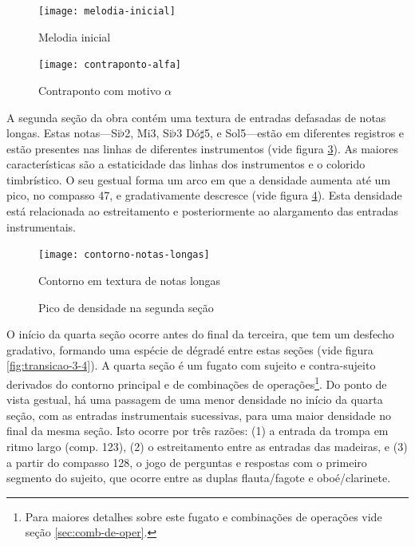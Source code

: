 \begin{figure}
  \centering
  \texttt{[image: melodia-inicial]}
  \caption{Melodia inicial}
  \label{fig:melodia-inicial}
\end{figure}

\begin{figure}
  \centering
  \texttt{[image: contraponto-alfa]}
  \caption{Contraponto com motivo $\alpha$}
  \label{fig:contraponto-alfa}
\end{figure}

A segunda seção da obra contém uma textura de entradas defasadas de
notas longas. Estas notas---Si$\flat$2, Mi3, Si$\flat$3 Dó$\sharp$5, e
Sol5---estão em diferentes registros e estão presentes nas linhas de
diferentes instrumentos (vide figura
\ref{fig:contorno-notas-longas}). As maiores características são a
estaticidade das linhas dos instrumentos e o colorido timbrístico. O
seu gestual forma um arco em que a densidade aumenta até um pico, no
compasso 47, e gradativamente descresce (vide figura
\ref{fig:pico-densidade-secao-2}). Esta densidade está relacionada ao
estreitamento e posteriormente ao alargamento das entradas
instrumentais.

\begin{figure}
  \centering
  \texttt{[image: contorno-notas-longas]}
  \caption{Contorno em textura de notas longas}
  \label{fig:contorno-notas-longas}
\end{figure}

\begin{figure}
  \centering
  \caption{Pico de densidade na segunda seção}
  \label{fig:pico-densidade-secao-2}
\end{figure}

O início da quarta seção ocorre antes do final da terceira, que tem um
desfecho gradativo, formando uma espécie de dégradé entre estas seções
(vide figura \ref{fig:transicao-3-4}). A quarta seção é um fugato com
sujeito e contra-sujeito derivados do contorno principal e de
combinações de operações\footnote{Para maiores detalhes sobre este
  fugato e combinações de operações vide seção
  \ref{sec:comb-de-oper}.}. Do ponto de vista gestual, há uma passagem
de uma menor densidade no início da quarta seção, com as entradas
instrumentais sucessivas, para uma maior densidade no final da mesma
seção. Isto ocorre por três razões: (1) a entrada da trompa em ritmo
largo (comp. 123), (2) o estreitamento entre as entradas das madeiras,
e (3) a partir do compasso 128, o jogo de perguntas e respostas com o
primeiro segmento do sujeito, que ocorre entre as duplas flauta/fagote
e oboé/clarinete.

